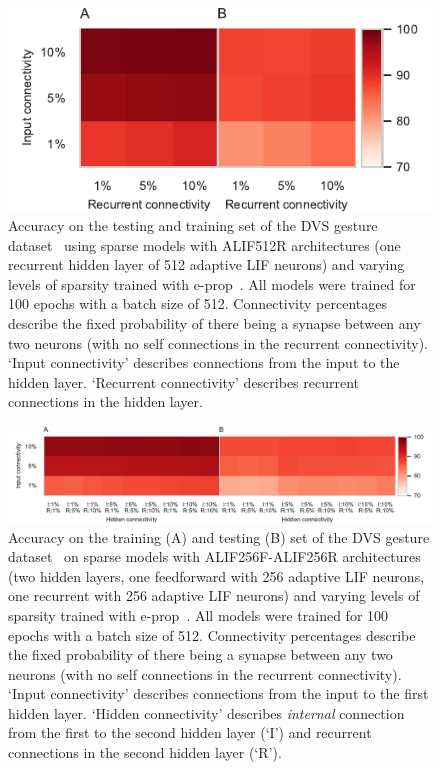 \documentclass[sigconf]{acmart}
\begin{document}
\begin{figure}[t]
  \centering
  \includegraphics{figures/sparse_accuracy.pdf}
  \caption{Accuracy on the testing and training set of the DVS gesture dataset~\citep{amir_low_2017} using sparse models with ALIF512R architectures (one recurrent hidden layer of 512 adaptive LIF neurons) and varying levels of sparsity trained with e-prop~\citep{Bellec2020}.
  All models were trained for 100 epochs with a batch size of 512.
  Connectivity percentages describe the fixed probability of there being a synapse between any two neurons (with no self connections in the recurrent connectivity).
  `Input connectivity' describes connections from the input to the hidden layer.
  `Recurrent connectivity' describes recurrent connections in the hidden layer.}
  \label{fig:sparse_accuracy}
\end{figure}

\begin{figure}[t]
  \centering
  \includegraphics{figures/two_layer_sparse_accuracy.pdf}
  \caption{Accuracy on the training (A) and testing (B) set of the DVS gesture dataset~\citep{amir_low_2017} on sparse models with ALIF256F-ALIF256R architectures (two hidden layers, one feedforward with 256 adaptive LIF neurons, one recurrent with 256 adaptive LIF neurons) and varying levels of sparsity trained with e-prop~\citep{Bellec2020}.
  All models were trained for 100 epochs with a batch size of 512.
  Connectivity percentages describe the fixed probability of there being a synapse between any two neurons (with no self connections in the recurrent connectivity).
  `Input connectivity' describes connections from the input to the first hidden layer.
  `Hidden connectivity' describes \emph{internal} connection from the first to the second hidden layer (`I') and recurrent connections in the second hidden layer (`R').}
  \label{fig:two_layer_sparse_accuracy}
\end{figure}
\end{document}
